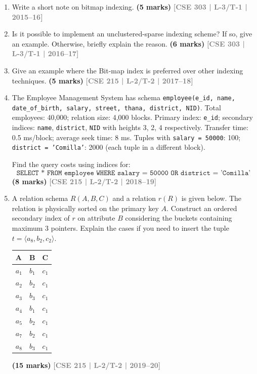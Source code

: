 \documentclass[12pt,a3paper]{article}
\newcommand{\yr}[1]{\hfill\textcolor{gray}{\small\textbf{[#1]}}}
\newcommand{\mk}[1]{\textcolor{orange!70!black}{\small\textbf{(#1 marks)}}}
\begin{document}
\begin{enumerate}
\item Write a short note on bitmap indexing.
\mk{5} \yr{CSE 303 | L-3/T-1 | 2015--16}

\item Is it possible to implement an unclustered-sparse indexing scheme? If so, give an example. Otherwise, briefly explain the reason.
\mk{6} \yr{CSE 303 | L-3/T-1 | 2016--17}

\item Give an example where the Bit-map index is preferred over other indexing techniques.
\mk{5} \yr{CSE 215 | L-2/T-2 | 2017--18}

\item The Employee Management System has schema \texttt{employee(e\_id, name, date\_of\_birth, salary, street, thana, district, NID)}. Total employees: 40,000; relation size: 4,000 blocks. Primary index: \texttt{e\_id}; secondary indices: \texttt{name}, \texttt{district}, \texttt{NID} with heights 3, 2, 4 respectively. Transfer time: 0.5 ms/block; average seek time: 8 ms. Tuples with \texttt{salary = 50000}: 100; \texttt{district = 'Comilla'}: 2000 (each tuple in a different block).

Find the query costs using indices for:
\[\texttt{SELECT * FROM employee WHERE salary = 50000 OR district = 'Comilla'}\]
 \mk{8} \yr{CSE 215 | L-2/T-2 | 2018--19}

\item A relation schema $R(A, B, C)$ and a relation $r(R)$ is given below. The relation is physically sorted on the primary key $A$. Construct an ordered secondary index of $r$ on attribute $B$ considering the buckets containing maximum 3 pointers. Explain the cases if you need to insert the tuple $t = \langle a_8, b_2, c_2 \rangle$.

\medskip
\begin{center}
\small
\begin{tabular}{lll}
\toprule
\textbf{A} & \textbf{B} & \textbf{C}\\
\midrule
$a_1$ & $b_1$ & $c_1$\\
$a_2$ & $b_2$ & $c_1$\\
$a_3$ & $b_3$ & $c_1$\\
$a_4$ & $b_1$ & $c_1$\\
$a_5$ & $b_2$ & $c_1$\\
$a_7$ & $b_2$ & $c_1$\\
$a_8$ & $b_3$ & $c_1$\\
\bottomrule
\end{tabular}
\end{center}
\mk{15} \yr{CSE 215 | L-2/T-2 | 2019--20}


\end{enumerate}
\end{document}
